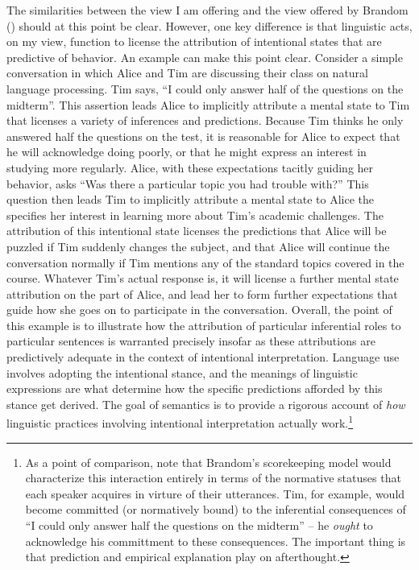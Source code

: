 The similarities between the view I am offering and the view offered by Brandom (\citeyear{Brandom:1994}) should at this point be clear. However, one key difference is that linguistic acts, on my view, function to license the attribution of intentional states that are predictive of behavior. An example can make this point clear. Consider a simple conversation in which Alice and Tim are discussing their class on natural language processing. Tim says, ``I could only answer half of the questions on the midterm''. This assertion leads Alice to implicitly attribute a mental state to Tim that licenses a variety of inferences and predictions. Because Tim thinks he only answered half the questions on the test, it is reasonable for Alice to expect that he will acknowledge doing poorly, or that he might express an interest in studying more regularly. Alice, with these expectations tacitly guiding her behavior, asks ``Was there a particular topic you had trouble with?'' This question then leads Tim to implicitly attribute a mental state to Alice the specifies her interest in learning more about Tim's academic challenges. The attribution of this intentional state licenses the predictions that Alice will be puzzled if Tim suddenly changes the subject, and that Alice will continue the conversation normally if Tim mentions any of the standard topics covered in the course. Whatever Tim's actual response is, it will license a further mental state attribution on the part of Alice, and lead her to form further expectations that guide how she goes on to participate in the conversation. Overall, the point of this example is to illustrate how the attribution of particular inferential roles to particular sentences is warranted precisely insofar as these attributions are predictively adequate in the context of intentional interpretation. Language use involves adopting the intentional stance, and the meanings of linguistic expressions are what determine how the specific predictions afforded by this stance get derived. The goal of semantics is to provide a rigorous account of \textit{how} linguistic practices involving intentional interpretation actually work.\footnote{As a point of comparison, note that Brandom's scorekeeping model would characterize this interaction entirely in terms of the normative statuses that each speaker acquires in virture of their utterances. Tim, for example, would become committed (or normatively bound) to the inferential consequences of ``I could only answer half the questions on the midterm'' -- he \textit{ought} to acknowledge his committment to these consequences. The important thing is that prediction and empirical explanation play on afterthought.} 

